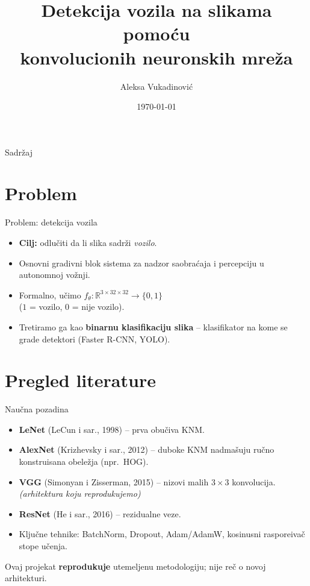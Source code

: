 \documentclass[aspectratio=169]{beamer}
\title[Detekcija vozila pomo\'cu KNM]{Detekcija vozila na slikama pomo\'cu\\konvolucionih neuronskih mre\v za}
\author{Aleksa Vukadinovi\'c}
\institute{Ra\v cunarska inteligencija}
\date{\today}
\begin{document}
\begin{frame}
  \titlepage
\end{frame}

\begin{frame}{Sadr\v zaj}
  \tableofcontents
\end{frame}

\section{Problem}
\begin{frame}{Problem: detekcija vozila}
  \begin{itemize}
    \item \textbf{Cilj:} odlu\v citi da li slika sadr\v zi \emph{vozilo}.
    \item Osnovni gradivni blok sistema za nadzor saobra\'caja i percepciju u
          autonomnoj vo\v znji.
    \item Formalno, u\v cimo
          $f_\theta : \mathbb{R}^{3\times 32\times 32} \to \{0,1\}$
          \\($1$ = vozilo, $0$ = nije vozilo).
    \item Tretiramo ga kao \textbf{binarnu klasifikaciju slika} -- klasifikator
          na kome se grade detektori (Faster R-CNN, YOLO).
  \end{itemize}
\end{frame}

\section{Pregled literature}
\begin{frame}{Nau\v cna pozadina}
  \begin{itemize}
    \item \textbf{LeNet} (LeCun i sar., 1998) -- prva obu\v civa KNM.
    \item \textbf{AlexNet} (Krizhevsky i sar., 2012) -- duboke KNM nadma\v suju
          ru\v cno konstruisana obele\v zja (npr.\ HOG).
    \item \textbf{VGG} (Simonyan i Zisserman, 2015) -- nizovi malih $3\times3$
          konvolucija. \emph{(arhitektura koju reprodukujemo)}
    \item \textbf{ResNet} (He i sar., 2016) -- rezidualne veze.
    \item Klju\v cne tehnike: BatchNorm, Dropout, Adam/AdamW, kosinusni
          raspore\dj iva\v c stope u\v cenja.
  \end{itemize}
  \vfill
  \footnotesize Ovaj projekat \textbf{reprodukuje} utemeljenu metodologiju; nije
  re\v c o novoj arhitekturi.
\end{frame}
\end{document}
